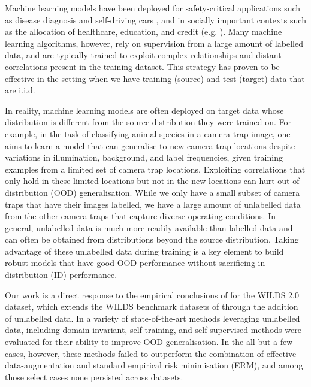 Machine learning models have been deployed for safety-critical applications such as disease
diagnosis \citep{watson2019clinical} and self-driving cars \citep{yu2020bdd100k}, and in socially
important contexts such as the allocation of healthcare, education, and credit (e.g.
\cite{DunYiLanReetal19, HurAde17}). 
%
%
Many machine learning algorithms, however, rely on supervision from a large amount of labelled
data, and are typically trained to exploit complex relationships and distant correlations present
in the training dataset. 
%
This strategy has proven to be effective in the setting when we have training (source) and test
(target) data that are i.i.d.

In reality, machine learning models are often deployed on target data whose distribution is
different from the source distribution they were trained on. 
%
For example, in the task of classifying animal species in a camera trap image, one aims to learn a
model that can generalise to new camera trap locations despite variations in illumination,
background, and label frequencies, given training examples from a limited set of camera trap
locations.
%
Exploiting correlations that only hold in these limited locations but not in the new locations can
hurt out-of-distribution (OOD) generalisation.
%
While we only have a small subset of camera traps that have their images labelled, we have a large
amount of unlabelled data from the other camera traps that capture diverse operating conditions. 
%
In general, unlabelled data is much more readily available than labelled data and can often be
obtained from distributions beyond the source distribution.
%
Taking advantage of these unlabelled data during training is a key element to build robust models
that have good OOD performance without sacrificing in-distribution (ID) performance.
%

Our work is a direct response to the empirical conclusions of \cite{SagWeiLeeGaoetal22} for the
WILDS 2.0 dataset, which extends the WILDS benchmark datasets of \cite{koh2021wilds} through the
addition of unlabelled data. %
In \citet{SagWeiLeeGaoetal22} a variety of state-of-the-art methods leveraging unlabelled data, including
domain-invariant, self-training, and self-supervised methods were evaluated for their ability to
improve OOD generalisation.
In the all but a few cases, however, these methods failed to outperform the combination of effective
data-augmentation and standard empirical risk minimisation (ERM), and among those select cases
none persisted across datasets.

